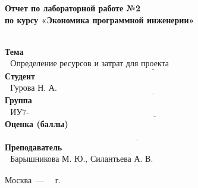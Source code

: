 \begin{titlepage}
	
	\begin{center}
		\Large\textbf{Отчет по лабораторной работе №2}\\
		\Large\textbf{по курсу «Экономика программной инженерии»}\\
		~\\
	\end{center}
	
	\noindent\textbf{Тема} $\underline{\text{~~Определение ресурсов и затрат для проекта~~~~~~~~~~~~~~~~~~~~~~~~~~~~~~~~~~~~~~~~~~~~~~~~}}$\newline\newline
	\noindent\textbf{Студент} $\underline{\text{~~Гурова Н. А.~~~~~~~~~~~~~~~~~~~~~~~~~~~~~~~~~~~~~~~~~~~~~~~~~~~~~~~~~~~~~~~~~~~~~~~~~~~~~~~~~~~~~~~~}}$\newline\newline
	\noindent\textbf{Группа} $\underline{\text{~~ИУ7-84Б~~~~~~~~~~~~~~~~~~~~~~~~~~~~~~~~~~~~~~~~~~~~~~~~~~~~~~~~~~~~~~~~~~~~~~~~~~~~~~~~~~~~~~~~~~~~~~~}}$\newline\newline
	\noindent\textbf{Оценка (баллы)} $\underline{\text{ ~~~~~~~~~~~~~~~~~~~~~~~~~~~~~~~~~~~~~~~~~~~~~~~~~~~~~~~~~~~~~~~~~~~~~~~~~~~~~~~~~~~~~~~~~~~~~~~}}$\newline\newline
	\noindent\textbf{Преподаватель} $\underline{\text{~~Барышникова М. Ю., Силантьева А. В.~~~~~~~~~~~~~~~~~~~~~~~~~~~~~~~~~~~~~~~~~}}$\newline
	
	\begin{center}
		\vfill
		Москва~---~\the\year
		~г.
	\end{center}
	\restoregeometry
\end{titlepage}

